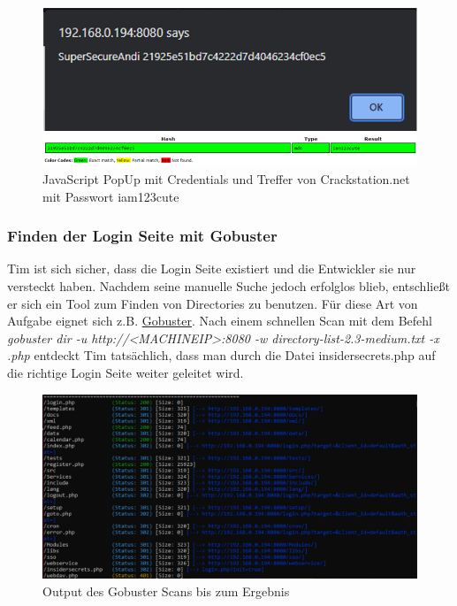 \documentclass[10pt, a4paper,onecolumn ,titlepage]{article}
\begin{document}
    \begin{figure}[H]
        \centering
        \includegraphics[width=1\textwidth]{VM1_Bilder/XSSHash.PNG}
        \caption{JavaScript PopUp mit Credentials und Treffer von Crackstation.net mit Passwort iam123cute}
        \label{fig:XSSHash}
    \end{figure}

    \subsubsection{Finden der Login Seite mit Gobuster}
    Tim ist sich sicher, dass die Login Seite existiert und die Entwickler sie nur versteckt haben. Nachdem seine manuelle Suche jedoch erfolglos blieb, entschließt er
    sich ein Tool zum Finden von Directories zu benutzen. Für diese Art von Aufgabe eignet sich z.B. \href{https://github.com/OJ/gobuster}{Gobuster}.
    Nach einem schnellen Scan mit dem Befehl \textit{gobuster dir -u http://<MACHINEIP>:8080 -w directory-list-2.3-medium.txt -x .php}
    entdeckt Tim tatsächlich, dass man durch die Datei insidersecrets.php auf die richtige Login Seite weiter geleitet wird.

    \begin{figure}[H]
        \centering
        \includegraphics[width=1\textwidth]{VM1_Bilder/GobusterScan.PNG}
        \caption{Output des Gobuster Scans bis zum Ergebnis}
        \label{fig:GobusterScan}
    \end{figure}
\end{document}
